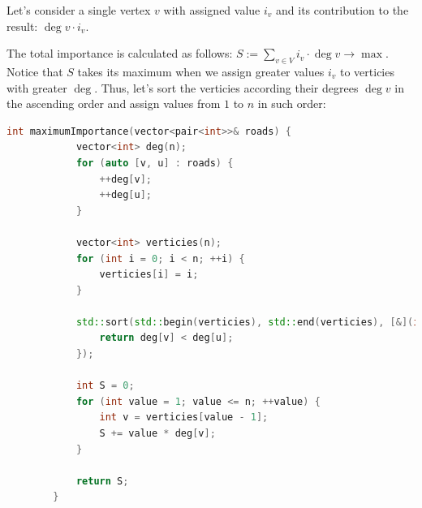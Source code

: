 \begin{solution}

    Let's consider a single vertex $v$ with assigned value $i_v$ and its contribution to the result: $\deg{v} \cdot i_v$.

    The total importance is calculated as follows: $S := \sum_{v \in V} i_v \cdot \deg{v} \to \max$. Notice that $S$ takes its maximum when we assign greater values $i_v$ to verticies with greater $\deg$. Thus, let's sort the verticies according their degrees $\deg{v}$ in the ascending order and assign values from $1$ to $n$ in such order:

    \begin{lstlisting}[language=C++]
        int maximumImportance(vector<pair<int>>& roads) {
            vector<int> deg(n);
            for (auto [v, u] : roads) {
                ++deg[v];
                ++deg[u];
            }

            vector<int> verticies(n);
            for (int i = 0; i < n; ++i) {
                verticies[i] = i;
            }

            std::sort(std::begin(verticies), std::end(verticies), [&](int v, int u) {
                return deg[v] < deg[u];
            });

            int S = 0;
            for (int value = 1; value <= n; ++value) {
                int v = verticies[value - 1];
                S += value * deg[v];
            }

            return S;
        }
    \end{lstlisting}

\end{solution}